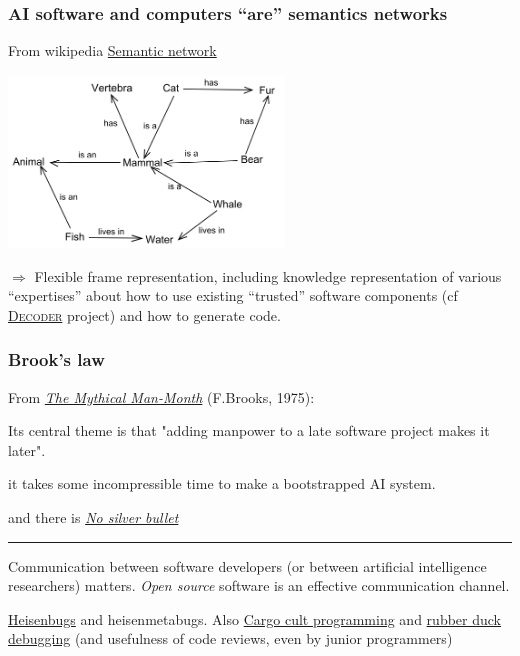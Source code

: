 \documentclass[xcolor=svgnames,final,smaller,a4]{beamer}
\begin{document}
 \begin{frame}
   \frametitle{AI software and computers ``are'' semantics networks}
 

 From wikipedia
 \href{https://en.wikipedia.org/wiki/Semantic_network}{Semantic
   network} {}

 \bigskip

 \begin{center}
 \includegraphics[width=0.55\textwidth]{Semantic-Net}
 \end{center}
 
 \bigskip
 
 $\Rightarrow$ Flexible frame representation, including knowledge
 representation of various ``expertises'' about how to use existing
 ``trusted'' software components (cf
 \href{https://www.decoder-project.eu/}{\textsc{Decoder}} project) and
 how to generate code.
 \end{frame}

 \begin{frame}
   \frametitle{Brook's law}

   From \href{https://en.wikipedia.org/wiki/The_Mythical_Man-Month}{\textit{The Mythical Man-Month}} (F.Brooks, 1975):

   Its central theme is that "adding manpower to a late software project makes it later".
   
   {

   it takes some incompressible time to make a bootstrapped AI system.}
   

   \medskip

   and there is \href{https://en.wikipedia.org/wiki/No_Silver_Bullet}{\textit{No silver bullet}}

   \smallskip
   
   \hrule

   \medskip
   
   Communication between software developers (or between artificial intelligence researchers) matters.
   \emph{Open source} software is an effective communication channel.

   \medskip

   \href{https://en.wikipedia.org/wiki/Heisenbug}{Heisenbugs} and
   heisenmetabugs.  Also
   \href{https://en.wikipedia.org/wiki/Cargo_cult_programming}{Cargo
     cult programming} and
   \href{https://en.wikipedia.org/wiki/Rubber_duck_debugging}{rubber
     duck debugging} (and usefulness of code reviews, even by junior programmers)
   
 \end{frame}
\end{document}
